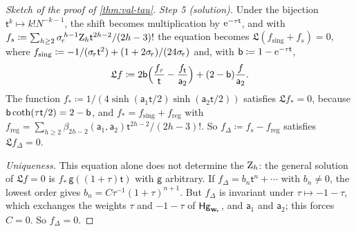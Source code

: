 \begin{proof}[Sketch of the proof of \cref{thm:val-tau}]
\emph{Step 5 (solution).} Under the bijection $\mathsf{t}^k\mapsto k!N^{-k-1}$, the shift becomes multiplication by $\mathrm{e}^{-\tau\mathsf{t}}$, and with $f_s\coloneqq\sum_{h\geq 2}\sigma_{\!\tau}^{\,h-1}\mathrm{Z}_h\mathsf{t}^{2h-2}/(2h-3)!$ the equation becomes $\mathfrak{L}(f_{\mathrm{sing}}+f_s)=0$, where $f_{\mathrm{sing}}\coloneqq-1/(\sigma_{\!\tau}\mathsf{t}^2)+(1+2\sigma_{\!\tau})/(24\sigma_{\!\tau})$ and, with $\mathsf{b}\coloneqq1-\mathrm{e}^{-\tau\mathsf{t}}$,
\[
\mathfrak{L}f\coloneqq2\mathsf{b}\Bigl(\frac{f_\tau}{\mathsf{t}}-\frac{f_{\mathsf{t}}}{\mathsf{a}_2}\Bigr)+(2-\mathsf{b})\frac{f}{\mathsf{a}_2}.
\]
The function $f_*\coloneqq1/(4\sinh(\mathsf{a}_1\mathsf{t}/2)\sinh(\mathsf{a}_2\mathsf{t}/2))$ satisfies $\mathfrak{L}f_*=0$, because $\mathsf{b}\coth(\tau\mathsf{t}/2)=2-\mathsf{b}$, and $f_*=f_{\mathrm{sing}}+f_{\mathrm{reg}}$ with $f_{\mathrm{reg}}=\sum_{h\geq 2}\beta_{2h-2}(\mathsf{a}_1,\mathsf{a}_2)\mathsf{t}^{2h-2}/(2h-3)!$. So $f_{\Delta}\coloneqq f_s-f_{\mathrm{reg}}$ satisfies $\mathfrak{L}f_{\Delta}=0$.

\emph{Uniqueness.} This equation alone does not determine the $\mathrm{Z}_h$: the general solution of $\mathfrak{L}f=0$ is $f_*\,\mathsf{g}((1+\tau)\mathsf{t})$ with $\mathsf{g}$ arbitrary. If $f_{\Delta}=b_n\mathsf{t}^n+\cdots$ with $b_n\neq 0$, the lowest order gives $b_n=C\tau^{-1}(1+\tau)^{n+1}$. But $f_{\Delta}$ is invariant under $\tau\mapsto-1-\tau$, which exchanges the weights $\tau$ and $-1-\tau$ of $\mathsf{Hg}_{\mathbf{w}_{\!\tau}}$, and $\mathsf{a}_1$ and $\mathsf{a}_2$; this forces $C=0$. So $f_{\Delta}=0$.
\end{proof}